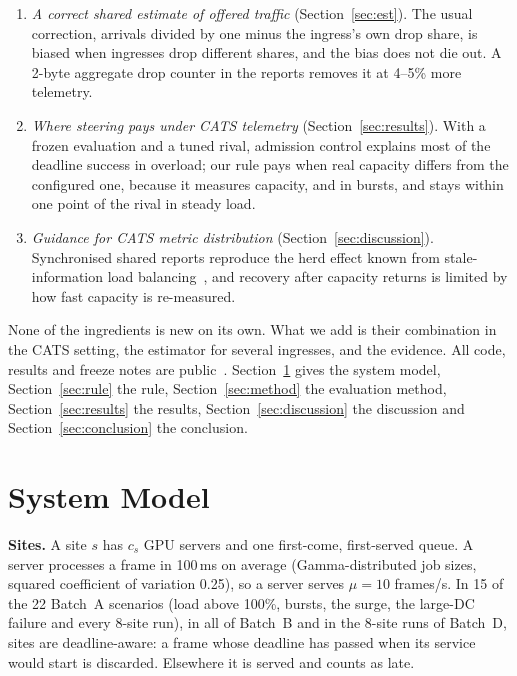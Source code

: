 \documentclass[conference]{IEEEtran}
\begin{document}
\begin{enumerate}
\item \emph{A correct shared estimate of offered traffic} (Section~\ref{sec:est}). The usual correction, arrivals divided by one minus the ingress's own drop share, is biased when ingresses drop different shares, and the bias does not die out. A 2-byte aggregate drop counter in the reports removes it at 4--5\% more telemetry.
\item \emph{Where steering pays under CATS telemetry} (Section~\ref{sec:results}). With a frozen evaluation and a tuned rival, admission control explains most of the deadline success in overload; our rule pays when real capacity differs from the configured one, because it measures capacity, and in bursts, and stays within one point of the rival in steady load.
\item \emph{Guidance for CATS metric distribution} (Section~\ref{sec:discussion}). Synchronised shared reports reproduce the herd effect known from stale-information load balancing~\cite{mitz2000old}, and recovery after capacity returns is limited by how fast capacity is re-measured.
\end{enumerate}
None of the ingredients is new on its own. What we add is their combination in the CATS setting, the estimator for several ingresses, and the evidence. All code, results and freeze notes are public~\cite{repo}. Section~\ref{sec:model} gives the system model, Section~\ref{sec:rule} the rule, Section~\ref{sec:method} the evaluation method, Section~\ref{sec:results} the results, Section~\ref{sec:discussion} the discussion and Section~\ref{sec:conclusion} the conclusion.

\section{System Model}\label{sec:model}
\textbf{Sites.} A site $s$ has $c_s$ GPU servers and one first-come, first-served queue. A server processes a frame in 100\,ms on average (Gamma-distributed job sizes, squared coefficient of variation 0.25), so a server serves $\mu = 10$ frames/s. In 15 of the 22 Batch~A scenarios (load above 100\%, bursts, the surge, the large-DC failure and every 8-site run), in all of Batch~B and in the 8-site runs of Batch~D, sites are deadline-aware: a frame whose deadline has passed when its service would start is discarded. Elsewhere it is served and counts as late.
\end{document}
